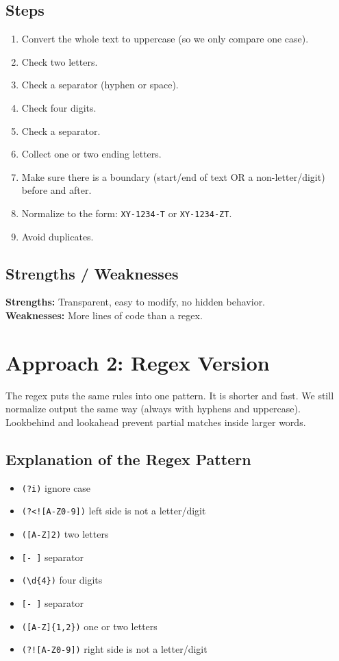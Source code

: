 \documentclass[12pt,a4paper]{article}
\begin{document}
\subsection{Steps}
\begin{enumerate}
    \item Convert the whole text to uppercase (so we only compare one case).
    \item Check two letters.
    \item Check a separator (hyphen or space).
    \item Check four digits.
    \item Check a separator.
    \item Collect one or two ending letters.
    \item Make sure there is a boundary (start/end of text OR a non-letter/digit) before and after.
    \item Normalize to the form: \texttt{XY-1234-T} or \texttt{XY-1234-ZT}.
    \item Avoid duplicates.
\end{enumerate}

\subsection{Strengths / Weaknesses}
\textbf{Strengths:} Transparent, easy to modify, no hidden behavior. \\
\textbf{Weaknesses:} More lines of code than a regex.

\section{Approach 2: Regex Version}
The regex puts the same rules into one pattern. It is shorter and fast. We still normalize output the same way (always with hyphens and uppercase). Lookbehind and lookahead prevent partial matches inside larger words.

\subsection{Explanation of the Regex Pattern}
\begin{itemize}
    \item \texttt{(?i)} ignore case
    \item \texttt{(?<![A-Z0-9])} left side is not a letter/digit
    \item \texttt{([A-Z]{2})} two letters
    \item \texttt{[- ]} separator
    \item \texttt{(\textbackslash d\{4\})} four digits
    \item \texttt{[- ]} separator
    \item \texttt{([A-Z]\{1,2\})} one or two letters
    \item \texttt{(?![A-Z0-9])} right side is not a letter/digit
\end{itemize}
\end{document}
